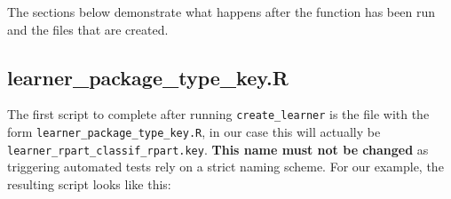 \documentclass[
]{scrbook}
\begin{document}
The sections below demonstrate what happens after the function has been run and the files that are created.

\hypertarget{learner_package_type_key.r}{%
\subsection{learner\_package\_type\_key.R}\label{learner_package_type_key.r}}

The first script to complete after running \texttt{create\_learner} is the file with the form \texttt{learner\_package\_type\_key.R}, in our case this will actually be \texttt{learner\_rpart\_classif\_rpart.key}. \textbf{This name must not be changed} as triggering automated tests rely on a strict naming scheme. For our example, the resulting script looks like this:
\end{document}
